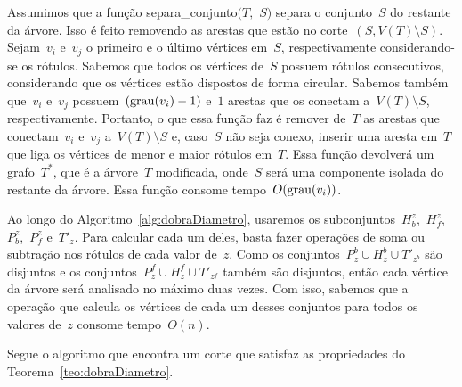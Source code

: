 		Assumimos que a função {\sc separa\_conjunto}$(T,$ $S)$
		separa o conjunto~$S$ do restante da árvore.
		Isso é feito removendo as arestas que estão no 
		corte~$(S,V(T)\setminus S)$.
		Sejam~$v_i$ e~$v_j$ o primeiro e o último vértices em~$S$, respectivamente
		considerando-se os rótulos.
		Sabemos que todos os vértices de~$S$ possuem
		rótulos consecutivos,
		considerando que os vértices estão dispostos de forma circular.
		Sabemos também que~$v_i$ e~$v_j$ possuem~${(\mathrm{grau}(v_i)-1)}$
		e~$1$ arestas que os conectam a~$V(T)\setminus S$, respectivamente.
		Portanto, o que essa função faz é remover de~$T$ as arestas que 
		conectam~$v_i$ e~$v_j$ a~$V(T)\setminus S$ e, caso~$S$ não seja
		conexo, inserir uma aresta em~$T$ que liga os vértices de menor e maior 
		rótulos em~$T$.
		Essa função devolverá um grafo~$T^*$, que é a árvore~$T$ modificada,
		onde~$S$ será uma componente
		isolada do restante da árvore. 
		Essa função consome tempo~$O(\mathrm{grau}(v_i))$.

		Ao longo do Algoritmo~\ref{alg:dobraDiametro}, usaremos
		os subconjuntos~$H_b^z$,~$H_f^z$,~$P_b^z$,~$P_f^z$ e~$T'_z$.
		Para calcular cada um deles, basta fazer operações de soma ou subtração
		nos rótulos de cada valor de~$z$.
		Como os conjuntos~${P^b_z\cup H^b_z\cup T'_{z^b}}$ são disjuntos
		e os conjuntos~${P^f_z\cup H^f_z\cup T'_{z^f}}$ também são disjuntos,
		então cada vértice da árvore será analisado no máximo duas vezes.
		Com isso, sabemos que a operação que calcula os vértices de cada um desses 
		conjuntos para todos os valores de~$z$ consome tempo~$O(n)$.


		Segue o algoritmo que encontra um corte que satisfaz as propriedades do
		Teorema~\ref{teo:dobraDiametro}.

		\bigskip

